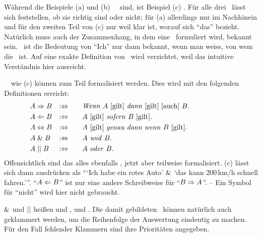 Während die Beispiele (a) und (b) \unzerlegbare\ \Aussagen\ sind, ist Beispiel (c) \zerlegbar.
Für alle drei \Aussagen\ lässt sich feststellen, ob sie richtig sind oder nicht;
für (a) allerdings nur im Nachhinein und für den zweiten Teil von (c) nur weil klar ist, worauf sich \enquote{das} bezieht.
Natürlich muss auch der Zusammenhang, in dem eine \Aussage\ formuliert wird, bekannt sein.
\textZB\ ist die Bedeutung von \enquote{Ich} nur dann bekannt, wenn man weiss, von wem die \Aussage\ ist.
Auf eine exakte Definition von \Aussage\ wird verzichtet, weil das intuitive Verständnis hier ausreicht.

\Zerlegbare\ \Aussagen\ wie (c) können zum Teil formalisiert werden.
Dies wird mit den folgenden Definitionen erreicht:
%
\begin{align}
	& A \Rightarrow   B & :\Leftrightarrow & \qquad
	\text{\emph{Wenn} $A$ [gilt] \emph{dann} [gilt] [auch] $B$.}
	\\
	& A \Leftarrow   B & :\Leftrightarrow & \qquad
	\text{$A$ [gilt] \emph{sofern}          $B$ [gilt].}
	\\
	& A \Leftrightarrow B & :\Leftrightarrow & \qquad
	\text{$A$ [gilt] \emph{genau dann wenn} $B$ [gilt].}
	\\
	& A \;\&\;   B & :\Leftrightarrow & \qquad
	\text{$A$ \emph{und}  $B$.}
	\\
	& A \;||\;    B & :\Leftrightarrow & \qquad
	\text{$A$ \emph{oder} $B$.}
	&&&&&&&&&&
\end{align}
%
Offensichtlich sind das alles ebenfalls \Aussagen, jetzt aber teilweise formalisiert.
(c) lässt sich dann ausdrücken als \enquote{\enquote{Ich habe ein rotes Auto} $\&$ \enquote{das kann 200\,km/h schnell fahren.}}.
\enquote{$A \Leftarrow B$} ist nur eine andere Schreibweise für \enquote{$B \Rightarrow A$}.
-- Ein Symbol für \enquote{nicht} wird hier nicht gebraucht.

$\&$\hidden{\glsIdxPl{\metaand}} und $||$\hidden{\glsIdxPl{\metaor}} heißen  und ,  und  .
Die damit gebildeten \Aussagen\ können natürlich auch geklammert werden, um die Reihenfolge der Auswertung eindeutig zu machen.
Für den Fall fehlender Klammern sind ihre Prioritäten  angegeben.

